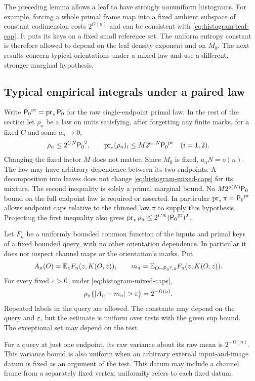 \begin{remark}\label{rem:histogram-leaf-versus-mixed}
The preceding lemma allows a leaf to have strongly nonuniform
histograms. For example, forcing a whole primal frame map into a
fixed ambient subspace of constant codimension costs $2^{O(n)}$ and
can be consistent with \eqref{eq:histogram-leaf-cap}. It puts its keys
on a fixed small reference set. The uniform entropy constant is
therefore allowed to depend on the leaf density exponent and on $M_0$.
The next results concern typical orientations under a mixed law and
use a different, stronger marginal hypothesis.
\end{remark}

\subsection{Typical empirical integrals under a paired law}

Write ${\mathsf P_0}^{\mathrm{pr}}=\operatorname{pr}_*{\mathsf P_0}$ for the raw
single-endpoint primal law.  In the rest of the section let $\rho_n$
be a law on units satisfying, after forgetting any finite marks,
for a fixed $C$ and some $a_n\to0$,
\begin{equation}\label{eq:histogram-mixed-caps}
 \rho_n\le2^{CN}{\mathsf P_0}^2,
 \qquad \operatorname{pr}_*(\rho_n)_i
       \le M2^{a_nN}{\mathsf P_0}^{\mathrm{pr}}\quad(i=1,2).
\end{equation}
Changing the fixed factor $M$ does not matter. Since $M_0$ is fixed,
$a_nN=o(n)$. The law may have arbitrary dependence between its two
endpoints. A decomposition into leaves does not change
\eqref{eq:histogram-mixed-caps} for its mixture.
The second inequality is solely a primal marginal bound.  No
$M2^{o(N)}{\mathsf P_0}$ bound on the full endpoint law is required or
asserted.  In particular $\operatorname{pr}_*\pi={\mathsf P_0}^{\mathrm{pr}}$
allows endpoint caps relative to the thinned law $\pi$ to supply this
hypothesis.  Projecting the first inequality also gives
$\operatorname{pr}_*\rho_n\le2^{CN}({\mathsf P_0}^{\mathrm{pr}})^2$.

\begin{lemma}
\label{lem:typicality}
Let $F_n$ be a uniformly bounded common function of the inputs and
primal keys of a fixed bounded query, with no other orientation
dependence. In particular it does not inspect channel maps or the
orientation's marks.
Put
\[
 A_n(O)=\mathbb E_z F_n(z,K(O,z)),\qquad
 m_n=\mathbb E_{O\sim{\mathsf P_0}^2,z}F_n(z,K(O,z)).
\]
For every fixed $\varepsilon>0$, under \eqref{eq:histogram-mixed-caps},
\[
 \rho_n\{\lvert A_n-m_n\rvert>\varepsilon\}=2^{-\Omega(n)}.
\]
Repeated labels in the query are allowed. The constants may depend on
the query and $\varepsilon$, but the estimate is uniform over tests with the
given sup bound. The exceptional set may depend on the test.

For a query at just one endpoint, its raw variance about its raw mean
is $2^{-\Omega(n)}$. This variance bound is also uniform when an
arbitrary external input-and-image datum is fixed as an argument of
the test. This datum may include a channel frame from a separately
fixed vertex; uniformity refers to each fixed datum.
\end{lemma}

